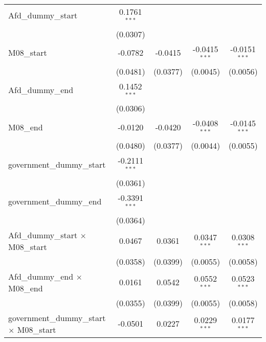 \documentclass[10pt,a4paper]{article}
\begin{document}
\begin{tabular}{lcccc}
   Afd\_dummy\_start                                & 0.1761$^{***}$  &                &                 &   \\   
                                                    & (0.0307)        &                &                 &   \\   
   M08\_start                                       & -0.0782         & -0.0415        & -0.0415$^{***}$ & -0.0151$^{***}$\\   
                                                    & (0.0481)        & (0.0377)       & (0.0045)        & (0.0056)\\   
   Afd\_dummy\_end                                  & 0.1452$^{***}$  &                &                 &   \\   
                                                    & (0.0306)        &                &                 &   \\   
   M08\_end                                         & -0.0120         & -0.0420        & -0.0408$^{***}$ & -0.0145$^{***}$\\   
                                                    & (0.0480)        & (0.0377)       & (0.0044)        & (0.0055)\\   
   government\_dummy\_start                         & -0.2111$^{***}$ &                &                 &   \\   
                                                    & (0.0361)        &                &                 &   \\   
   government\_dummy\_end                           & -0.3391$^{***}$ &                &                 &   \\   
                                                    & (0.0364)        &                &                 &   \\   
   Afd\_dummy\_start $\times$ M08\_start            & 0.0467          & 0.0361         & 0.0347$^{***}$  & 0.0308$^{***}$\\   
                                                    & (0.0358)        & (0.0399)       & (0.0055)        & (0.0058)\\   
   Afd\_dummy\_end $\times$ M08\_end                & 0.0161          & 0.0542         & 0.0552$^{***}$  & 0.0523$^{***}$\\   
                                                    & (0.0355)        & (0.0399)       & (0.0055)        & (0.0058)\\   
   government\_dummy\_start $\times$ M08\_start     & -0.0501         & 0.0227         & 0.0229$^{***}$  & 0.0177$^{***}$\\   

\end{tabular}
\end{document}
